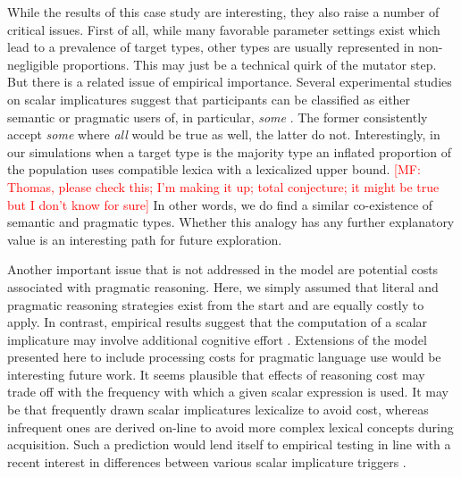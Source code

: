 \documentclass[a4paper, 11pt]{article}
\theoremstyle{Satz}
\newcommand{\mf}[1]{\textcolor{Red}{[MF: #1]}}
\begin{document}
While the results of this case study are interesting, they also raise a number of critical
issues. First of all, while many favorable parameter settings exist which lead to a prevalence
of target types, other types are usually represented in non-negligible proportions. This may
just be a technical quirk of the mutator step. But there is a related issue of empirical
importance. Several experimental studies on scalar implicatures suggest that participants can
be classified as either semantic or pragmatic users of, in particular, \emph{some}
\citep[e.g.][]{BottNoveck2004:Some-Utterances,NieuwlandDitman2010:On-the-incremen,DegenTanenhaus2012:Processing-Scal}. The
former consistently accept \emph{some} where \emph{all} would be true as well, the latter do
not. Interestingly, in our simulations when a target type is the majority type an inflated
proportion of the population uses compatible lexica with a lexicalized upper bound. \mf{Thomas,
  please check this; I'm making it up; total conjecture; it might be true but I don't know for
  sure} In other words, we do find a similar co-existence of semantic and pragmatic
types. Whether this analogy has any further explanatory value is an interesting path for future
exploration. 

Another important issue that is not addressed in the model are potential costs associated with
pragmatic reasoning. Here, we simply assumed that literal and pragmatic reasoning strategies
exist from the start and are equally costly to apply. In contrast, empirical results suggest
that the computation of a scalar implicature may involve additional cognitive effort
\citep[e.g.][]{BrehenyKatsos2006:Are-Generalised,deNeys+schaeken:2007,huang+snedeker:2009,Jr.Bailey2013:Possibly-all-of}. Extensions
of the model presented here to include processing costs for pragmatic language use would be
interesting future work. It seems plausible that effects of reasoning cost may trade off with
the frequency with which a given scalar expression is used. It may be that frequently drawn
scalar implicatures lexicalize to avoid cost, whereas infrequent ones are derived on-line to
avoid more complex lexical concepts during acquisition. Such a prediction would lend itself to
empirical testing in line with a recent interest in differences between various scalar
implicature triggers \citep{Tielvan-TielMiltenburgvan-Miltenburg2014:Scalar-Diversit}.
\end{document}
